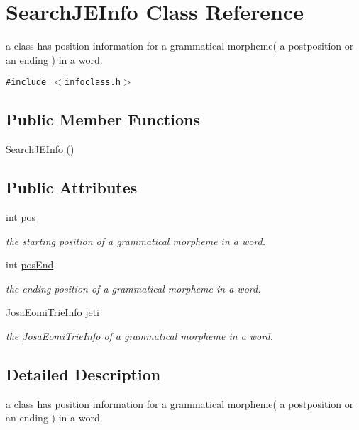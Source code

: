 \hypertarget{classSearchJEInfo}{
\section{SearchJEInfo Class Reference}
\label{classSearchJEInfo}
}
a class has position information for a grammatical morpheme( a postposition or an ending ) in a word.  


{\tt \#include $<$infoclass.h$>$}

\subsection*{Public Member Functions}
\begin{CompactItemize}
\item 
\hyperlink{classSearchJEInfo_d4e8898e38d35343a687a23123bd8592}{SearchJEInfo} ()
\end{CompactItemize}
\subsection*{Public Attributes}
\begin{CompactItemize}
\item 
int \hyperlink{classSearchJEInfo_d0650a6510380f4cae43044766f8b1d9}{pos}
\begin{CompactList}\small\item\em the starting position of a grammatical morpheme in a word. \item\end{CompactList}\item 
int \hyperlink{classSearchJEInfo_9fe8ff0266d11342a2f5833d2a9016b0}{posEnd}
\begin{CompactList}\small\item\em the ending position of a grammatical morpheme in a word. \item\end{CompactList}\item 
\hyperlink{classJosaEomiTrieInfo}{JosaEomiTrieInfo} \hyperlink{classSearchJEInfo_dac85ff8226c9c1e9f8810578edd78d0}{jeti}
\begin{CompactList}\small\item\em the \hyperlink{classJosaEomiTrieInfo}{JosaEomiTrieInfo} of a grammatical morpheme in a word. \item\end{CompactList}\end{CompactItemize}


\subsection{Detailed Description}
a class has position information for a grammatical morpheme( a postposition or an ending ) in a word. 

